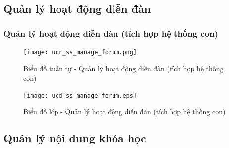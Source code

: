 \documentclass[./../main.tex]{subfiles}
\begin{document}
\subsection{Quản lý hoạt động diễn đàn}
\subsubsection{Quản lý hoạt động diễn đàn (tích hợp hệ thống con)}
\begin{figure}[H]
    \centering
    \texttt{[image: ucr\_ss\_manage\_forum.png]}
    \caption{Biểu đồ tuần tự - Quản lý hoạt động diễn đàn (tích hợp hệ thống con)}
\end{figure}
\begin{figure}[H]
    \centering
    \texttt{[image: ucd\_ss\_manage\_forum.eps]}
    \caption{Biểu đồ lớp - Quản lý hoạt động diễn đàn (tích hợp hệ thống con)}
\end{figure}

\subsection{Quản lý nội dung khóa học}
\end{document}
